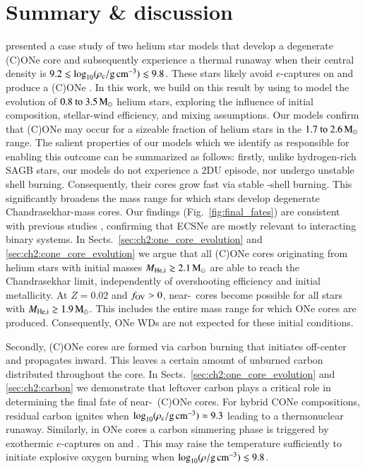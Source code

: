 \documentclass[main.tex]{subfiles}
\begin{document}
\section{Summary \& discussion} \label{sec:ch2:summary}
 \cite{antoniadis2020}  presented a case study of two helium star models that  develop a 
degenerate (C)ONe core  and subsequently experience a 
thermal runaway when their central density is $9.2 \lesssim \log_{10} (\rho_{\mathrm{c}}/ \mathrm{g\,cm^{-3}}) \lesssim 9.8$. These stars likely avoid $e$-captures on 
 and produce a (C)ONe \ia. 
In this work, we build on this result by using \mesa to model the evolution of $\numrange{0.8}{3.5}\msun$ helium stars, exploring the influence of initial composition, stellar-wind efficiency, and mixing assumptions. 
Our models confirm that (C)ONe \ias may occur for a sizeable fraction of  helium stars in the $\numrange{1.7}{2.6}\msun$ range. The salient properties of our models which we identify as responsible for enabling this outcome can be summarized as follows: firstly, unlike hydrogen-rich SAGB stars, our models do not experience a 2DU episode, nor undergo unstable shell burning. Consequently, their cores grow fast via stable -shell burning. This significantly broadens the mass range for which stars develop degenerate Chandrasekhar-mass cores. Our findings (Fig.~\ref{fig:final_fates}) are consistent with previous studies  \citep[e.g.,][]{Podsiadlowski:2003py,Poelarends:2007ip,Poelarends:2017dua}, confirming that ECSNe are mostly relevant to interacting binary systems. In Sects.~\ref{sec:ch2:one_core_evolution} and \ref{sec:ch2:cone_core_evolution} we argue that all (C)ONe cores originating from helium stars with initial masses $M_{\rm He, i}\gtrsim 2.1\mathrm{\,M_\odot}$ are able to reach the Chandrasekhar limit, independently of overshooting efficiency and initial metallicity. At $Z=0.02$ and $f_{\rm OV}>0$, near-\mch\ cores become possible for all stars with  $M_{\rm He, i}\gtrsim 1.9\mathrm{\,M_\odot}$. This includes the entire mass range for which ONe cores are produced. Consequently, ONe WDs are not expected for these initial conditions.

Secondly, (C)ONe cores are formed via carbon burning that initiates off-center and propagates inward. This leaves a certain amount of unburned carbon distributed throughout the core.  
In Sects.~\ref{sec:ch2:one_core_evolution} and \ref{sec:ch2:carbon} we demonstrate that leftover carbon plays a critical role in determining the final fate of near-\mch\ (C)ONe cores. For hybrid CONe compositions, residual carbon ignites when $\log_{10} (\rho_{\mathrm{c}}/ \mathrm{g\,cm^{-3}}) \simeq 9.3$ leading to a thermonuclear runaway. Similarly, in ONe cores a carbon simmering phase is triggered by exothermic $e$-captures on  and . This may raise the temperature sufficiently to initiate explosive oxygen burning when $\log_{10} (\rho/ \mathrm{g\,cm^{-3}}) \lesssim 9.8$. 
\end{document}
